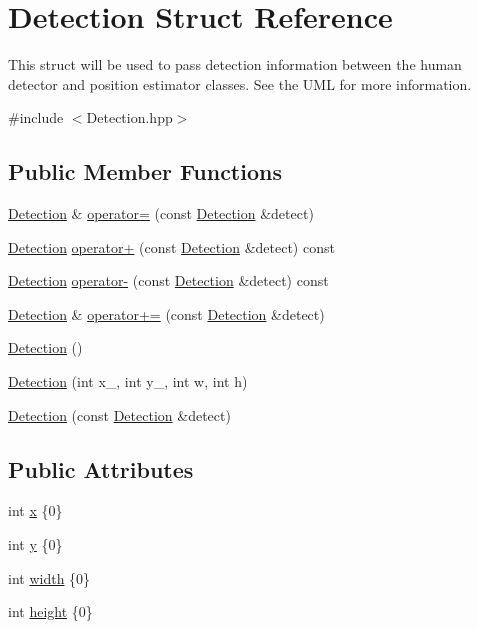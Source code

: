 \hypertarget{struct_detection}{}\section{Detection Struct Reference}
\label{struct_detection}


This struct will be used to pass detection information between the human detector and position estimator classes. See the U\+ML for more information.  




{\ttfamily \#include $<$Detection.\+hpp$>$}

\subsection*{Public Member Functions}
\begin{DoxyCompactItemize}
\item 
\hyperlink{struct_detection}{Detection} \& \hyperlink{struct_detection_a98d5bca326ea2f369156fb07be1f5466}{operator=} (const \hyperlink{struct_detection}{Detection} \&detect)
\item 
\hyperlink{struct_detection}{Detection} \hyperlink{struct_detection_a69eb856cdc75d10db04c169d557815d1}{operator+} (const \hyperlink{struct_detection}{Detection} \&detect) const
\item 
\hyperlink{struct_detection}{Detection} \hyperlink{struct_detection_ae156f11b8c51921c6c785a921fc43e85}{operator-\/} (const \hyperlink{struct_detection}{Detection} \&detect) const
\item 
\hyperlink{struct_detection}{Detection} \& \hyperlink{struct_detection_a51bbeca262f4c0328f85eb9b32e97020}{operator+=} (const \hyperlink{struct_detection}{Detection} \&detect)
\item 
\hyperlink{struct_detection_a86e6ebf5a660a29e78ee7a7f08292260}{Detection} ()
\item 
\hyperlink{struct_detection_ac35051436ab3ae544f40f9aa08a0ebb1}{Detection} (int x\+\_\+, int y\+\_\+, int w, int h)
\item 
\hyperlink{struct_detection_ad50a7695ff3ce61ee5c10443d9210c1e}{Detection} (const \hyperlink{struct_detection}{Detection} \&detect)
\end{DoxyCompactItemize}
\subsection*{Public Attributes}
\begin{DoxyCompactItemize}
\item 
int \hyperlink{struct_detection_a7b71921325261514cd6dd42c8e90ba70}{x} \{0\}
\item 
int \hyperlink{struct_detection_afa5d065ea13ce74dfd52c6a569313270}{y} \{0\}
\item 
int \hyperlink{struct_detection_af88e469657d3bc4807caff6c5f9e9475}{width} \{0\}
\item 
int \hyperlink{struct_detection_a4f3d0bf4072f7e5a200767ab3d838fe2}{height} \{0\}
\end{DoxyCompactItemize}


